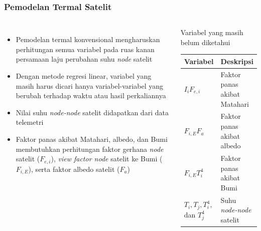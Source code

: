 \documentclass[8pt]{beamer}
\begin{document}
\begin{frame}
  \frametitle{Pemodelan Termal Satelit}
  \begin{columns}[T]
    \begin{itemize}
      \item Pemodelan termal konvensional mengharuskan perhitungan semua variabel pada ruas kanan persamaan laju perubahan suhu \textit{node} satelit
      \item Dengan metode regresi linear, variabel yang masih harus dicari hanya variabel-variabel yang berubah terhadap waktu atau hasil perkaliannya
      \item Nilai suhu \textit{node-node} satelit didapatkan dari data telemetri
      \item Faktor panas akibat Matahari, albedo, dan Bumi membutuhkan perhitungan faktor gerhana \textit{node} satelit ($F_{e,i}$), \textit{view factor node} satelit ke Bumi ($F_{i,E}$), serta faktor albedo satelit ($F_a$)
    \end{itemize}
    \begin{block}{\center Variabel yang masih belum diketahui}
    \begin{table}[H]
\begin{center}
\begin{tabular}{|l|l|}
\hline
Variabel & Deskripsi \\ \hline
	$I_i F_{e,i}$        & Faktor panas akibat Matahari         \\ \hline
	$F_{i,E} F_a$        & Faktor panas akibat albedo         \\ \hline
	$F_{i,E} T_i^4$        & Faktor panas akibat Bumi         \\ \hline
	$T_i, T_j, T_i^4,$ dan $T_j^4$        & Suhu \textit{node-node} satelit         \\ \hline
\end{tabular}
\end{center}
\end{table}
    \end{block}
  \end{columns}
\end{frame}
\end{document}
